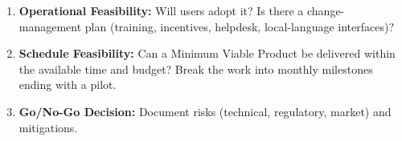 \documentclass[11pt]{article}
\begin{document}
\begin{methode}
\begin{enumerate}
\begin{itemize}
            \item \textbf{MINCOMMERCE / Trade Register:} Business registration; e-commerce declarations where applicable.
            \item \textbf{OHADA:} Accounting compliance (SYSCOHADA chart of accounts).
            \item \textbf{Intellectual Property:} OAPI registration for brand and software protection.
        \end{itemize}
    \item \textbf{Operational Feasibility:} Will users adopt it? Is there a change-management plan (training, incentives, helpdesk, local-language interfaces)?
    \item \textbf{Schedule Feasibility:} Can a Minimum Viable Product be delivered within the available time and budget? Break the work into monthly milestones ending with a pilot.
    \item \textbf{Go/No-Go Decision:} Document risks (technical, regulatory, market) and mitigations.
\end{enumerate}
\end{methode}
\end{document}

